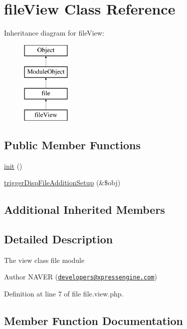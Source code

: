 \hypertarget{classfileView}{}\section{file\+View Class Reference}
\label{classfileView}
Inheritance diagram for file\+View\+:\begin{figure}[H]
\begin{center}
\leavevmode
\includegraphics[height=4.000000cm]{classfileView}
\end{center}
\end{figure}
\subsection*{Public Member Functions}
\begin{DoxyCompactItemize}
\item 
\hyperlink{classfileView_a57621b8a911bfe916164f7210ae57d00}{init} ()
\item 
\hyperlink{classfileView_a7df980966b9a93c9416959ba21c14c55}{trigger\+Disp\+File\+Addition\+Setup} (\&\$obj)
\end{DoxyCompactItemize}
\subsection*{Additional Inherited Members}


\subsection{Detailed Description}
The view class file module \begin{DoxyAuthor}{Author}
N\+A\+V\+ER (\href{mailto:developers@xpressengine.com}{\tt developers@xpressengine.\+com}) 
\end{DoxyAuthor}


Definition at line 7 of file file.\+view.\+php.



\subsection{Member Function Documentation}
\hypertarget{classfileView_a57621b8a911bfe916164f7210ae57d00}{}\label{classfileView_a57621b8a911bfe916164f7210ae57d00} 
